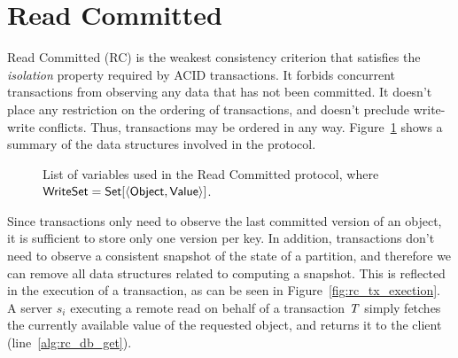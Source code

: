 \clearpage

\section{Read Committed}
\label{appendix:rc}

Read Committed (RC) is the weakest consistency criterion that satisfies the \emph{isolation} property required by ACID transactions. It forbids concurrent transactions from observing any data that has not been committed. It doesn't place any restriction on the ordering of transactions, and doesn't preclude write-write conflicts. Thus, transactions may be ordered in any way. Figure~\ref{fig:rc-prot-ds-table} shows a summary of the data structures involved in the protocol.

\begin{figure}[h]
\noindent{}
\caption{List of variables used in the Read Committed protocol, where ${\sf WriteSet} = {\sf Set}[\langle {\sf Object}, {\sf Value} \rangle]$.}
\label{fig:rc-prot-ds-table}
\end{figure}

Since transactions only need to observe the last committed version of an object, it is sufficient to store only one version per key. In addition, transactions don't need to observe a consistent snapshot of the state of a partition, and therefore we can remove all data structures related to computing a snapshot. This is reflected in the execution of a transaction, as can be seen in Figure~\ref{fig:rc_tx_exection}. A server $s_i$ executing a remote read on behalf of a transaction $\mathit{T}$ simply fetches the currently available value of the requested object, and returns it to the client (line~\ref{alg:rc_db_get}).

